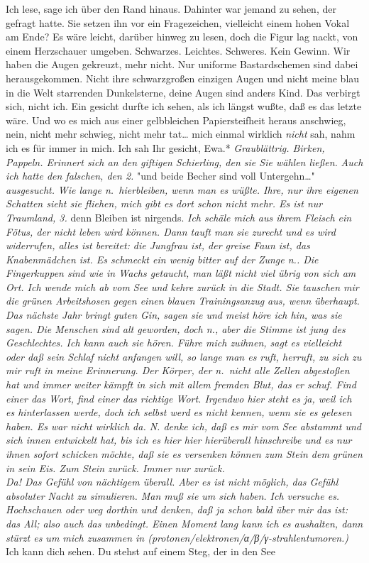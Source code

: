 \documentclass[
]{article}
\begin{document}
Ich lese, sage ich über den Rand hinaus. Dahinter war jemand zu sehen,
der gefragt hatte. Sie setzen ihn vor ein Fragezeichen, vielleicht einem
hohen Vokal am Ende? Es wäre leicht, darüber hinweg zu lesen, doch die
Figur lag nackt, von einem Herzschauer umgeben. Schwarzes. Leichtes.
Schweres. Kein Gewinn. Wir haben die Augen gekreuzt, mehr nicht. Nur
uniforme Bastardschemen sind dabei herausgekommen. Nicht ihre
schwarzgroßen einzigen Augen und nicht meine blau in die Welt starrenden
Dunkelsterne, deine Augen sind anders Kind. Das verbirgt sich, nicht
ich. Ein gesicht durfte ich sehen, als ich längst wußte, daß es das
letzte wäre. Und wo es mich aus einer gelbbleichen Papiersteifheit
heraus anschwieg, nein, nicht mehr schwieg, nicht mehr tat\ldots{} mich
einmal wirklich \emph{nicht} sah, nahm ich es für immer in mich. Ich sah
Ihr gesicht, Ewa.* \emph{Graublättrig. Birken, Pappeln. Erinnert sich an
den giftigen Schierling, den sie Sie wählen ließen.} \emph{Auch ich
hatte den falschen, den 2. }"und beide Becher sind voll Untergehn\ldots"
\emph{ausgesucht.} \emph{Wie lange n.~hierbleiben, wenn man es wüßte.
Ihre, nur ihre eigenen Schatten sieht sie fliehen, mich gibt es dort
schon nicht mehr. Es ist nur Traumland, 3. }denn Bleiben ist nirgends.
\emph{Ich schäle mich aus ihrem Fleisch ein Fötus, der nicht leben wird
können. Dann tauft man sie zurecht und es wird widerrufen, alles ist
bereitet: die Jungfrau ist, der greise Faun ist, das Knabenmädchen ist.
Es schmeckt ein wenig bitter auf der Zunge n.. Die Fingerkuppen sind wie
in Wachs getaucht, man läßt nicht viel übrig von sich am Ort. Ich wende
mich ab vom See und kehre zurück in die Stadt. Sie tauschen mir die
grünen Arbeitshosen gegen einen blauen Trainingsanzug aus, wenn
überhaupt. Das nächste Jahr bringt guten Gin, sagen sie und meist höre
ich hin, was sie sagen. Die Menschen sind alt geworden, doch n., aber
die Stimme ist jung des Geschlechtes. Ich kann auch sie hören. Führe
mich zuihnen, sagt es vielleicht oder daß sein Schlaf nicht anfangen
will, so lange man es ruft, herruft, zu sich zu mir ruft in meine
Erinnerung. Der Körper, der n.~nicht alle Zellen abgestoßen hat und
immer weiter kämpft in sich mit allem fremden Blut, das er schuf. Find
einer das Wort, find einer das richtige Wort. Irgendwo hier steht es ja,
weil ich es hinterlassen werde, doch ich selbst werd es nicht kennen,
wenn sie es gelesen haben. Es war nicht wirklich da. N. denke ich, daß
es mir vom See abstammt und sich innen entwickelt hat, bis ich es hier
hier hierüberall hinschreibe und es nur ihnen sofort schicken möchte,
daß sie es versenken können zum Stein dem grünen in sein Eis. Zum Stein
zurück. Immer nur zurück.\\
Da! Das Gefühl von nächtigem überall. Aber es ist nicht möglich, das
Gefühl absoluter Nacht zu simulieren. Man muß sie um sich haben. Ich
versuche es. Hochschauen oder weg dorthin und denken, daß ja schon bald
über mir das ist: das All; also auch das unbedingt. Einen Moment lang
kann ich es aushalten, dann stürzt es um mich zusammen in
(protonen/elektronen/α/β/γ-strahlentumoren.)\\
}Ich kann dich sehen. Du stehst auf einem Steg, der in den See
\end{document}
